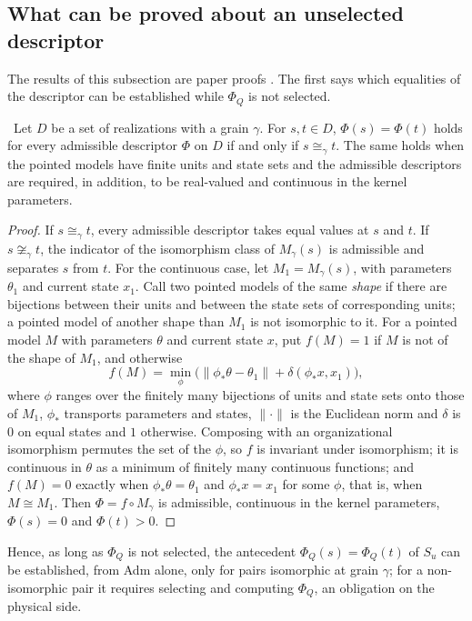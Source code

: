 \subsection{What can be proved about an unselected descriptor}
The results of this subsection are paper proofs \stA. The first says which equalities of the descriptor can be established while $\Phi_Q$ is not selected.

\begin{proposition}\label{prop:provable}
\stA\ Let $D$ be a set of realizations with a grain $\gamma$. For $s,t\in D$, $\Phi(s)=\Phi(t)$ holds for every admissible descriptor $\Phi$ on $D$ if and only if $s\cong_\gamma t$. The same holds when the pointed models have finite units and state sets and the admissible descriptors are required, in addition, to be real-valued and continuous in the kernel parameters.
\end{proposition}
\begin{proof}
If $s\cong_\gamma t$, every admissible descriptor takes equal values at $s$ and $t$. If $s\not\cong_\gamma t$, the indicator of the isomorphism class of $M_\gamma(s)$ is admissible and separates $s$ from $t$. For the continuous case, let $M_1=M_\gamma(s)$, with parameters $\theta_1$ and current state $x_1$. Call two pointed models of the same \emph{shape} if there are bijections between their units and between the state sets of corresponding units; a pointed model of another shape than $M_1$ is not isomorphic to it. For a pointed model $M$ with parameters $\theta$ and current state $x$, put $f(M)=1$ if $M$ is not of the shape of $M_1$, and otherwise
\[
f(M)=\min_{\phi}\bigl(\lVert\phi_*\theta-\theta_1\rVert+\delta(\phi_*x,x_1)\bigr),
\]
where $\phi$ ranges over the finitely many bijections of units and state sets onto those of $M_1$, $\phi_*$ transports parameters and states, $\lVert\cdot\rVert$ is the Euclidean norm and $\delta$ is $0$ on equal states and $1$ otherwise. Composing with an organizational isomorphism permutes the set of the $\phi$, so $f$ is invariant under isomorphism; it is continuous in $\theta$ as a minimum of finitely many continuous functions; and $f(M)=0$ exactly when $\phi_*\theta=\theta_1$ and $\phi_*x=x_1$ for some $\phi$, that is, when $M\cong M_1$. Then $\Phi=f\circ M_\gamma$ is admissible, continuous in the kernel parameters, $\Phi(s)=0$ and $\Phi(t)>0$.
\end{proof}
Hence, as long as $\Phi_Q$ is not selected, the antecedent $\Phi_Q(s)=\Phi_Q(t)$ of $S_u$ can be established, from Adm alone, only for pairs isomorphic at grain $\gamma$; for a non-isomorphic pair it requires selecting and computing $\Phi_Q$, an obligation on the physical side.

